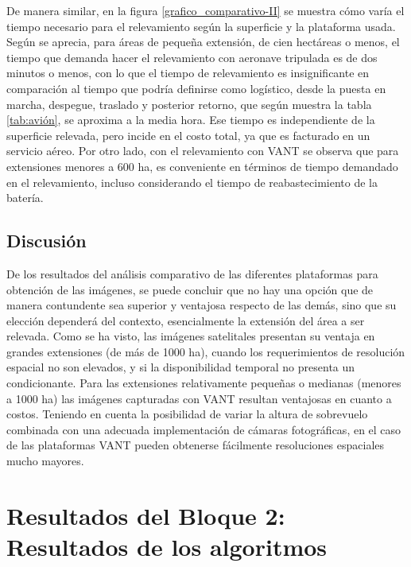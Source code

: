 De manera similar, en la figura \ref{grafico_comparativo-II} se muestra cómo varía el tiempo necesario para el relevamiento según la superficie y la plataforma usada. Según se aprecia, para áreas de pequeña extensión, de cien hectáreas o menos, el tiempo que demanda hacer el relevamiento con aeronave tripulada es de dos minutos o menos, con lo que el tiempo de relevamiento es insignificante en comparación al tiempo que podría definirse como logístico, desde la puesta en marcha, despegue, traslado y posterior retorno, que según muestra la tabla \ref{tab:avión}, se aproxima a la media hora. Ese tiempo es independiente de la superficie relevada, pero incide en el costo total, ya que es facturado en un servicio aéreo. Por otro lado, con el relevamiento con VANT se observa que para extensiones menores a 600 ha, es conveniente en términos de tiempo demandado en el relevamiento, incluso considerando el tiempo de reabastecimiento de la batería.

\subsection{Discusión}
De los resultados del análisis comparativo de las diferentes plataformas para obtención de las imágenes, se puede concluir que no hay una opción que de manera contundente sea superior y ventajosa respecto de las demás, sino que su elección dependerá del contexto, esencialmente la extensión del área a ser relevada. Como se ha visto, las imágenes satelitales presentan su ventaja en grandes extensiones (de más de 1000 ha), cuando los requerimientos de resolución espacial no son elevados, y si la disponibilidad temporal no presenta un condicionante. Para las extensiones relativamente pequeñas o medianas (menores a 1000 ha) las imágenes capturadas con VANT resultan ventajosas en cuanto a costos. Teniendo en cuenta la posibilidad de variar la altura de sobrevuelo combinada con una adecuada implementación de cámaras fotográficas, en el caso de las plataformas VANT pueden obtenerse fácilmente resoluciones espaciales mucho mayores. 
\section{Resultados del Bloque 2: Resultados de los algoritmos}
